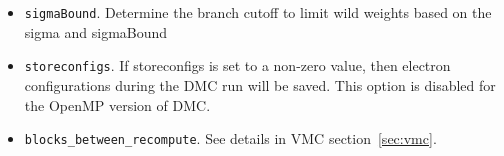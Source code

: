 \begin{itemize}
\item \texttt{sigmaBound}.  Determine the branch cutoff to limit wild weights based on the sigma and sigmaBound


\item \texttt{storeconfigs}. If storeconfigs is set to a non-zero value, then electron configurations during the DMC run will be saved. This option is disabled for the OpenMP version of DMC.

\item \texttt{blocks\_between\_recompute}. See details in VMC section~\ref{sec:vmc}.











\end{itemize}

